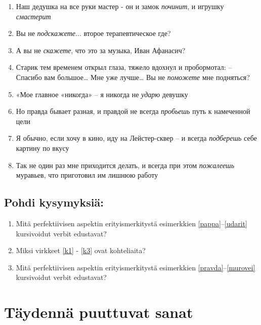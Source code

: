 \documentclass[paper=a4, fontsize=11pt]{scrartcl}
\begin{document}
\begin{enumerate}
    \item \label{pappa} Наш дедушка на все руки мастер - он и замок \emph{починит}, и игрушку \emph{смастерит}
    \item \label{k1} Вы не \emph{подскажете}... второе терапевтическое где? 
    \item \label{k2} А вы не \emph{скажете}, что это за музыка, Иван Афанасич? 
    \item \label{k3} Старик тем временем открыл глаза, тяжело вдохнул и пробормотал: -- Спасибо вам большое… Мне уже лучше… Вы не \emph{поможете} мне подняться? 
    \item \label{udarit} «Мое главное «никогда» -- я никогда не \emph{ударю} девушку 
    \item \label{pravda} Но правда бывает разная, и правдой не всегда \emph{пробьешь} путь к намеченной цели
    \item \label{leicester} Я обычно, если хочу в кино, иду на Лейстер-сквер -- и всегда \emph{подберешь} себе картину по вкусу
    \item \label{murovei} Так не один раз мне приходится делать, и всегда при этом \emph{пожалеешь} муравьев, что приготовил им лишнюю работу
\end{enumerate}

\subsection{Pohdi kysymyksiä:}

\singlespacing
\begin{enumerate}
    \item Mitä perfektiivisen aspektin erityismerkitystä esimerkkien \ref{pappa}--\ref{udarit} kursivoidut verbit edustavat?
    \item Miksi virkkeet \ref{k1} - \ref{k3} ovat kohteliaita?
    \item Mitä perfektiivisen aspektin erityismerkitystä esimerkkien \ref{pravda}--\ref{murovei} kursivoidut verbit edustavat?
\end{enumerate}

\onehalfspacing


\section{Täydennä puuttuvat sanat}
\end{document}
